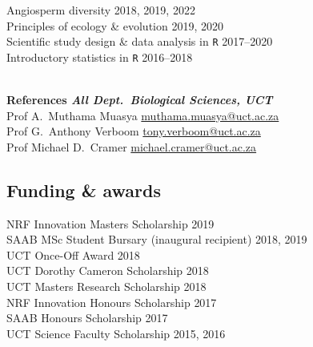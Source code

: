 \documentclass[10pt]{article}
\begin{document}
\begin{multicols}{2}
Angiosperm diversity                         \hfill {\small 2018, 2019, 2022} \\
Principles of ecology \& evolution           \hfill {\small       2019, 2020} \\
Scientific study design \& data analysis in
  \texttt{R}                                 \hfill {\small       2017--2020} \\
Introductory statistics in \texttt{R}        \hfill {\small       2016--2018} \\

\

\textbf{References %
        \hfill {\small \textmd{\textit{All Dept.~Biological Sciences, UCT}}}} \\

Prof A.~Muthama Muasya
      \hfill \href{mailto:muthama.muasya@uct.ac.za}{muthama.muasya@uct.ac.za} \\
Prof G.~Anthony Verboom
      \hfill     \href{mailto:tony.verboom@uct.ac.za}{tony.verboom@uct.ac.za} \\
Prof Michael D.~Cramer
      \hfill \href{mailto:michael.cramer@uct.ac.za}{michael.cramer@uct.ac.za} \\

\subsection*{Funding \& awards} %

NRF Innovation Masters Scholarship                 \hfill {\small       2019} \\
SAAB MSc Student Bursary
  {\small (inaugural recipient)}                   \hfill {\small 2018, 2019} \\
UCT Once-Off Award                                 \hfill {\small       2018} \\
UCT Dorothy Cameron Scholarship                    \hfill {\small       2018} \\
UCT Masters Research Scholarship                   \hfill {\small       2018} \\
NRF Innovation Honours Scholarship                 \hfill {\small       2017} \\
SAAB Honours Scholarship                           \hfill {\small       2017} \\
UCT Science Faculty Scholarship                    \hfill {\small 2015, 2016} \\


\end{multicols}
\end{document}

